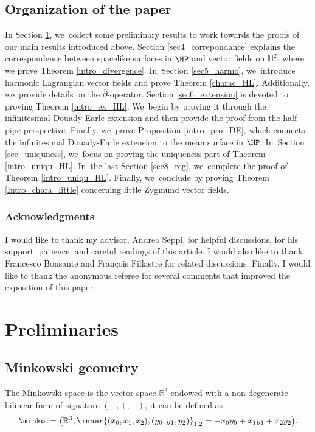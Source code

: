 \subsection{Organization of the paper}
In Section \ref{section3}, we~collect some preliminary results to work towards the proofs of our main results introduced above. Section \ref{sec4_correpondance} explains the correspondence between spacelike surfaces in \(\HP \) and vector fields on \(\mathbb{H}^2 \), where we prove Theorem \ref{intro_divergence}. In~Section \ref{sec5_harmo}, we~introduce harmonic Lagrangian vector fields and prove Theorem \ref{charac_HL}. Additionally, we~provide details on the \(\overline{\partial}\)-operator. Section \ref{sec6_extension} is devoted to proving Theorem \ref{intro_ex_HL}. We~begin by proving it through the infinitesimal Douady-Earle extension and then provide the proof from the half-pipe perspective. Finally, we~prove Proposition \ref{intro_pro_DE}, which connects the infinitesimal Douady-Earle extension to the mean surface in \(\HP \). In~Section \ref{sec_uniquness}, we~focus on proving the uniqueness part of Theorem \ref{intro_uniqu_HL}. In~the last Section \ref{sec8_reg}, we~complete the proof of Theorem \ref{intro_uniqu_HL}. Finally, we~conclude by proving Theorem \ref{Intro_chara_little} concerning little Zygmund vector fields.

\subsubsection*{Acknowledgments}

I would like to thank my advisor, Andrea Seppi, for helpful discussions, for his support, patience, and careful readings of this article. I would also like to thank Francesco Bonsante and François Fillastre for related discussions. Finally, I would like to thank the anonymous referee for several comments
that improved the exposition of this paper.


\section{Preliminaries}\label{section3}
\subsection{Minkowski geometry}
The Minkowski space is the vector space $\mathbb{R}^3$ endowed with a non degenerate bilinear form of signature $(-,+,+)$, it can be defined as
\[
\minko:=\bigl(\mathbb{R}^3, \inner{(x_0,x_1,x_2),(y_0,y_1,y_2)}_{1,2}=-x_0y_0+x_1y_1+x_2y_2\bigr).
\]

